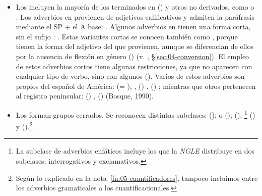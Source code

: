 \begin{itemize}
  \item Los  incluyen la mayoría de los
        terminados en  () y
        otros no derivados, como  o . Los adverbios
        en  provienen de adjetivos calificativos y admiten la
        paráfrasis mediante el SP  + el A base:
        . Algunos adverbios en
         tienen una forma corta, sin el sufijo :
        . Estas variantes cortas
        se conocen también como , porque tienen la
        forma del adjetivo del que provienen, aunque se diferencian de ellos por
        la ausencia de flexión en género () (v. , §\ref{sec:04-conversion}). El empleo de estos
        adverbios cortos tiene algunas restricciones, ya que no aparecen con
        cualquier tipo de verbo, sino con algunos (). Varios de estos adverbios son
        propios del español de América:  (= ),
        , () ,
        () ; mientras que otros pertenecen
        al registro peninsular: () ,
        ()  (Bosque,
        1990).
  \item Los  forman grupos cerrados. Se
        reconocen distintas subclases:  ();  o 
        (); 
        (); \footnote{La subclase
        de adverbios enfáticos incluye los que la \textit{NGLE}
        \parencite[§\,30.2j]{rae2025} distribuye en dos subclases:
        interrogativos y exclamativos.} () y
         ().\footnote{Según lo explicado en la
        nota~\ref{fn:05-cuantificadores}, tampoco incluimos entre los adverbios
        gramaticales a los cuantificacionales.}
\end{itemize}

